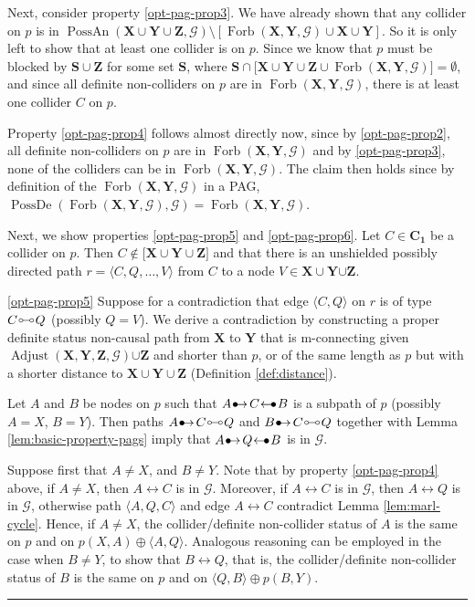 \documentclass[twoside]{article}
\DeclareMathOperator{\PossDe}{PossDe}
\DeclareMathOperator{\PossAn}{PossAn}
\DeclareMathOperator{\Forb}{Forb}
\newcommand{\fb}[2][X,Y]{\Forb(\mb{#1},#2)}
\DeclareMathOperator{\Adjust}{Adjust}
\newcommand{\adjustb}[2][X,Y,Z]{\Adjust(\mb{#1},#2)}
\newcommand{\mb}[1]{\mathbf{#1}}
\newcommand{\g}[1][G]{\mathcal{#1}}
\newenvironment{proofof}[1][]{\begin{trivlist}
\item[\hskip \labelsep {\bfseries Proof of #1.}]}{\hfill\BlackBox\end{trivlist}}
\newcommand{\BlackBox}{\rule{1.5ex}{1.5ex}}
\newcommand{\bulletarrow}{
  \setlength{\unitlength}{1mm}
  \begin{picture}(5,1)(0,0)
    \put(0.2,0){$\bullet$}
    \put(1,0){$\rightarrow$}
  \end{picture}
}
\newcommand{\arrowbullet}{
  \setlength{\unitlength}{1mm}
  \begin{picture}(5,1)(0,0)
    \put(0.2,0){$\leftarrow$}
    \put(3,0){$\bullet$}
  \end{picture}
}
\newcommand{\circcirc}{
  \setlength{\unitlength}{1mm}
  \begin{picture}(5,1)(0,0)
    \put(1,1){\circle{1}}
    \put(1.5,1){\line(1,0){2}}
    \put(4,1){\circle{1}}
  \end{picture}
}
\begin{document}
\begin{proofof}[Lemma \ref{lem:adjust-and-o-pag-helper}]
    Next, consider property \ref{opt-pag-prop3}. We have already shown that any collider on $p$ is in $\PossAn(\mb{X} \cup \mb{Y} \cup \mb{Z}, \g) \setminus [\fb{\g} \cup \mb{X} \cup \mb{Y}]$. So it is only left to show that at least one collider is on $p$. Since we know that $p$ must be blocked by  $\mb{S} \cup \mb{Z}$ for some set $\mb{S}$, where $\mb{S} \cap {\big[ \mb{X} \cup \mb{Y} \cup \mb{Z} \cup \fb{\g} \big]} = \emptyset$, and since all definite non-colliders on $p$ are in  $\fb{\g}$, there is at least one collider $C$ on $p$.

    Property \ref{opt-pag-prop4} follows almost directly now, since by \ref{opt-pag-prop2}, all definite non-colliders on $p$ are in $\fb{\g}$ and by \ref{opt-pag-prop3}, none of the colliders can be in $\fb{\g}$. The claim then holds since by definition of the $\fb{\g}$ in a PAG, $\PossDe(\fb{\g}, \g) = \fb{\g}$.

    Next, we show properties \ref{opt-pag-prop5} and \ref{opt-pag-prop6}. Let $C \in \mb{C_1}$ be a collider on $p$. Then $C \notin \big[\mb{X} \cup \mb{Y} \cup \mb{Z} \big]$ and that there is an unshielded possibly directed path $r = \langle C, Q, \dots, V\rangle$ from $C$ to a node $V \in \mb{X} \cup \mb{Y} {\cup \mb{Z}}$.
   
    \ref{opt-pag-prop5} Suppose for a contradiction that edge $\langle C,Q \rangle$ on $r$ is of type $C \circcirc Q$ (possibly $Q =V$). We derive a contradiction by constructing a proper definite status non-causal path from $\mb{X}$ to $\mb{Y}$ that is m-connecting given $\adjustb{\g} {\cup \mb{Z}}$ and shorter than $p$, or of the same length as $p$ but with a shorter distance to $\mb{X} \cup \mb{Y} \cup \mb{Z}$ (Definition \ref{def:distance}).

    Let $A$ and $B$ be nodes on $p$ such that $A \bulletarrow C \arrowbullet B$ is a subpath of $p$ (possibly $A=X$, $B=Y$). Then paths $A \bulletarrow C \circcirc Q$ and $B \bulletarrow C \circcirc Q$ together with Lemma \ref{lem:basic-property-pags} imply that $A \bulletarrow Q \arrowbullet B$ is in $\g$.

    Suppose first that $A \neq X$, and $B \neq Y$. Note that by property \ref{opt-pag-prop4} above, if $A \neq X$, then $A \leftrightarrow C$ is in $\g$. Moreover, if $A \leftrightarrow C$ is in $\g$, then $A \leftrightarrow Q$ is in $\g$, otherwise path $\langle A,Q,C \rangle$ and edge $A \leftrightarrow C$  contradict Lemma \ref{lem:marl-cycle}. Hence, if $A \neq X$, the collider/definite non-collider status of $A$ is the same on $p$ and on $p(X,A) \oplus \langle A,Q\rangle$. Analogous reasoning  can be employed in the case when $B \neq Y$, to show that $B \leftrightarrow Q$, that is, the collider/definite non-collider status of $B$ is the same on $p$ and on $\langle Q, B \rangle \oplus p(B,Y)$. 


\end{proofof}
\end{document}
